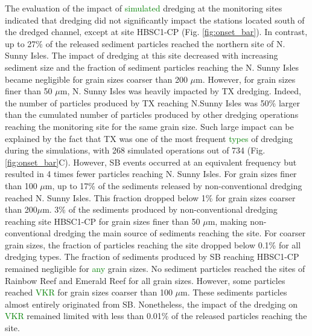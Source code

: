 \documentclass[preprint,12pt,authoryear]{elsarticle}
\newcommand{\modif}[1]{\textcolor{green}{#1}}
\begin{document}
The evaluation of the impact of \modif{simulated} dredging at the monitoring sites indicated that dredging did not significantly impact the stations located south of the dredged channel, except at site HBSC1-CP (Fig. \ref{fig:onset_bar}). In contrast, up to 27\% of the released sediment particles reached the northern site of N. Sunny Isles. The impact of dredging at this site decreased with increasing sediment size and the fraction of sediment particles reaching the N. Sunny Isles became negligible for grain sizes coarser than 200 $\mu$m. However, for grain sizes finer than 50 $\mu$m, N. Sunny Isles was heavily impacted by TX dredging. Indeed, the number of particles produced by TX reaching N.Sunny Isles was 50\% larger than the cumulated number of particles produced by other dredging operations reaching the monitoring site for the same grain size. Such large impact can be explained by the fact that TX was one of the most frequent \modif{types} of dredging during the simulations, with 268 simulated operations out of 734 (Fig. \ref{fig:onset_bar}C). However, SB events occurred at an equivalent frequency but resulted in 4 times fewer particles reaching N. Sunny Isles. For grain sizes finer than 100 $\mu$m, up to 17\% of the sediments released by non-conventional dredging reached N. Sunny Isles. This fraction dropped below  1\% for grain sizes coarser than 200$\mu$m. 3\% of the sediments produced by non-conventional dredging reaching site HBSC1-CP for grain sizes finer than 50 $\mu$m, making non-conventional dredging the main source of sediments reaching the site. For coarser grain sizes, the fraction of particles reaching the site dropped below 0.1\% for all dredging types.
The fraction of sediments produced by SB reaching HBSC1-CP remained negligible for \modif{any} grain sizes. No sediment particles reached the sites of Rainbow Reef and Emerald Reef for all grain sizes. However, some particles reached \modif{VKR} for grain sizes coarser than 100 $\mu$m. These sediments particles almost entirely originated from SB. Nonetheless, the impact of the dredging on \modif{VKR} remained limited with less than 0.01$\%$ of the released particles reaching the site.
\end{document}
